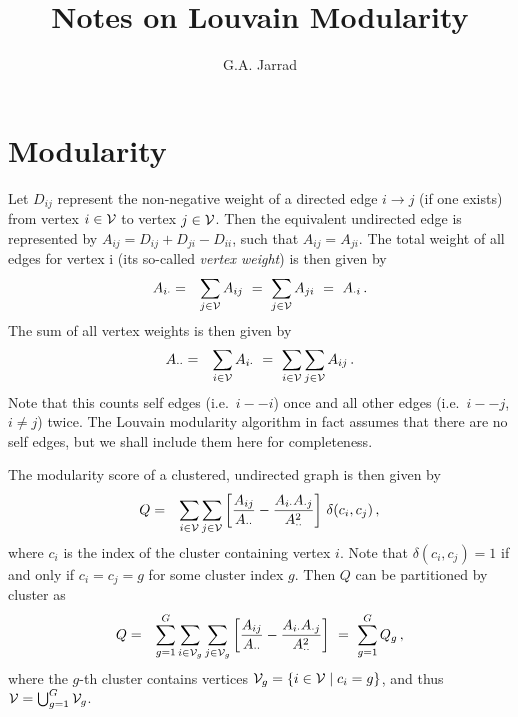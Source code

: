 \documentclass[a4paper]{article}
\title{Notes on Louvain Modularity}
\author{G.A. Jarrad}
\begin{document}
\maketitle
{}
\section{Modularity}\label{sec:Q}
Let $D_{ij}$ represent the non-negative weight of a directed edge $i\rightarrow j$ (if one exists) 
from vertex $i\in{\cal V}$ to vertex $j\in{\cal V}$. Then the equivalent undirected edge is represented
by $A_{ij}=D_{ij}+D_{ji}-D_{ii}$, such that $A_{ij}=A_{ji}$. The total weight of all 
edges for vertex i (its so-called {\em vertex weight}) is then given by
\begin{eqnarray}
  A_{i\cdot} & = & \sum_{j\in{\cal V}} A_{ij}~=~\sum_{j\in{\cal V}} A_{ji}~=~A_{\cdot i}\,.
\end{eqnarray}
The sum of all vertex weights is then given by
\begin{eqnarray}
  A_{\cdot\cdot} & = & \sum_{i\in{\cal V}} A_{i\cdot}
  ~=~\sum_{i\in{\cal V}}\sum_{j\in{\cal V}} A_{ij}\,.
\end{eqnarray}
Note that this counts self edges (i.e.\ $i -- i$) once and all other edges (i.e.\ $i -- j$, 
$i\ne j$) twice. The Louvain modularity algorithm in fact assumes that there are no self edges, but we
shall include them here for completeness.

The modularity score of a clustered, undirected graph is then given by
\begin{eqnarray}
  Q & = & \sum_{i\in{\cal V}}\sum_{j\in{\cal V}} \left[
  \frac{A_{ij}}{A_{\cdot\cdot}}-
  \frac{A_{i\cdot}A_{\cdot j}}{A_{\cdot\cdot}^2}
  \right]\,\delta(c_i,c_j)\,,
\end{eqnarray}
where $c_i$ is the index of the cluster containing vertex $i$. Note that
$\delta(c_i,c_j)=1$ if and only if $c_i=c_j=g$ for some cluster index $g$. Then $Q$ can be
partitioned by cluster as
\begin{eqnarray}
  Q & = & \sum_{g=1}^G\sum_{i\in{\cal V}_g}\sum_{j\in{\cal V}_g} \left[
  \frac{A_{ij}}{A_{\cdot\cdot}}-
  \frac{A_{i\cdot}A_{\cdot j}}{A_{\cdot\cdot}^2}
  \right]~=~\sum_{g=1}^G Q_g\,,
\label{eq:Qg}
\end{eqnarray}
where the $g$-th cluster contains vertices ${\cal V}_g=\{i\in{\cal V}\;|\;c_i=g\}$,
and thus ${\cal V}=\bigcup_{g=1}^G {\cal V}_g$.
\end{document}
